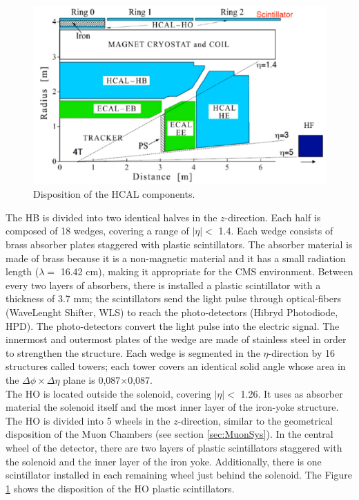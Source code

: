 

\begin{center}
\begin{figure}[h]
\centering
\includegraphics[scale=0.4]{figuras/Chapter2/HCAL1}
\caption{Disposition of the HCAL components.}\label{figchp2:HCAL}
\end{figure}
\end{center}

\noindent The HB is divided into two identical halves in the $z$-direction. Each half is composed of 18
wedges, covering a range of $|\eta| < $ 1.4. Each wedge consists of brass absorber plates 
staggered with plastic scintillators. The absorber material is made of brass 
because it is a non-magnetic material and it has a small 
radiation length ($\lambda = $ 16.42 cm), making it appropriate for the CMS environment. Between every
two layers of absorbers, there is installed a plastic scintillator with a thickness of 3.7 mm; the scintillators
send the light pulse through optical-fibers (WaveLenght Shifter, WLS) to reach the 
photo-detectors (Hibryd Photodiode, HPD). The photo-detectors convert the light pulse 
into the electric signal. The innermost and 
outermost plates of the wedge are made of stainless steel in order to strengthen the structure. Each wedge 
is segmented in the $\eta$-direction by 16 structures called towers; each tower 
covers an identical solid angle whose area in the $\Delta\phi\times\Delta\eta$ plane is 0,087$\times$0,087. \\

\noindent The HO is located outside the solenoid, covering $|\eta| < $ 1.26. It uses as absorber 
material the solenoid itself and the most inner layer of the 
iron-yoke structure. The HO is divided into
5 wheels in the $z$-direction, similar to the geometrical disposition 
of the Muon Chambers (see section \ref{sec:MuonSys}). In the central wheel of the detector, there 
are two layers of plastic scintillators staggered with the solenoid and the inner 
layer of the iron yoke. Additionally, there is one scintillator installed in 
each remaining wheel just behind the solenoid. The Figure \ref{figchp2:HCAL} shows the disposition of 
the HO plastic scintillators. \\

